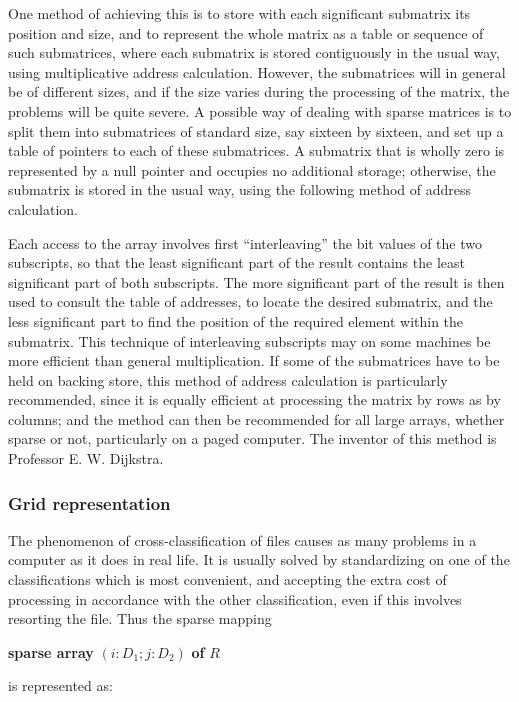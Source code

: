 One method of achieving this is to store with each significant submatrix its position and size, and to represent the whole matrix as a table or sequence of such submatrices, where each submatrix is stored contiguously in the usual way, using multiplicative address calculation. However, the submatrices will in general be of different sizes, and if the size varies during the processing of the matrix, the problems will be quite severe. A possible way of dealing with sparse matrices is to split them into submatrices of standard size, say sixteen by sixteen, and set up a table of pointers to each of these submatrices. A submatrix that is wholly zero is represented by a null pointer and occupies no additional storage; otherwise, the submatrix is stored in the usual way, using the following method of address calculation.

Each access to the array involves first ``interleaving'' the bit values of the two subscripts, so that the least significant part of the result contains the least significant part of both subscripts. The more significant part of the result is then used to consult the table of addresses, to locate the desired submatrix, and the less significant part to find the position of the required element within the submatrix. This technique of interleaving subscripts may on some machines be more efficient than general multiplication. If some of the submatrices have to be held on backing store, this method of address calculation is particularly recommended, since it is equally efficient at processing the matrix by rows as by columns; and the method can then be recommended for all large arrays, whether sparse or not, particularly on a paged computer. The inventor of this method is Professor E. W. Dijkstra.

\subsubsection{Grid representation}

The phenomenon of cross-classification of files causes as many problems in a computer as it does in real life. It is usually solved by standardizing on one of the classifications which is most convenient, and accepting the extra cost of processing in accordance with the other classification, even if this involves resorting the file. Thus the sparse mapping

\quad \textbf{sparse array} $(i:D_1; j:D_2)$ \textbf{of} $R$

\noindent
is represented as:

